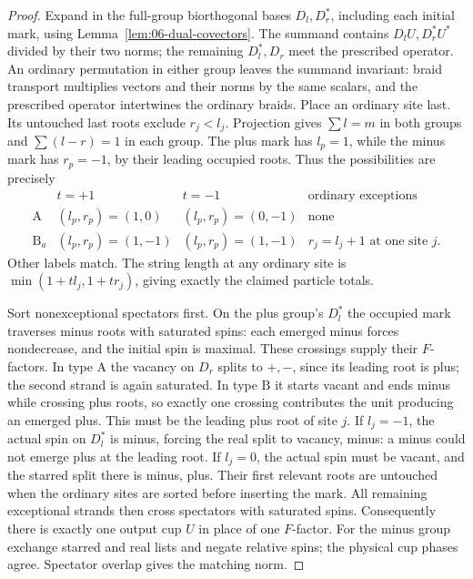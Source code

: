 \begin{proof}
Expand in the full-group biorthogonal bases \(D_l,D_r^*\), including
each initial mark, using Lemma~\ref{lem:06-dual-covectors}.  The summand
contains \(D_lU,D_r^*U^*\) divided by their two norms; the remaining
\(D_l^*,D_r\) meet the prescribed operator.  An ordinary permutation
in either group leaves the summand invariant: braid transport multiplies
vectors and their norms by the same scalars, and the prescribed operator
intertwines the ordinary braids.  Place an ordinary site last.  Its
untouched last roots exclude \(r_j<l_j\).  Projection gives
\(\sum l=m\) in both groups and \(\sum(l-r)=1\) in each group.
The plus mark has \(l_p=1\), while the minus mark has \(r_p=-1\),
by their leading occupied roots.  Thus the possibilities are precisely
\[
\begin{array}{c|cc|c}
 &t=+1&t=-1&\text{ordinary exceptions}\\ \hline
\mathrm A&(l_p,r_p)=(1,0)&(l_p,r_p)=(0,-1)&\text{none}\\
\mathrm B_a&(l_p,r_p)=(1,-1)&(l_p,r_p)=(1,-1)&
 r_j=l_j+1\text{ at one site }j.
\end{array}
\]
Other labels match.  The string length at any ordinary site is
\(\min(1+t l_j,1+t r_j)\), giving exactly the claimed particle totals.

Sort nonexceptional spectators first.  On the plus group's \(D_l^*\)
the occupied mark traverses minus roots with saturated spins: each
emerged minus forces nondecrease, and the initial spin is maximal.
These crossings supply their \(F\)-factors.  In type \(\mathrm A\)
the vacancy on \(D_r\) splits to \(+,-\), since its leading root is
plus; the second strand is again saturated.  In type \(\mathrm B\)
it starts vacant and ends minus while crossing plus roots, so exactly
one crossing contributes the unit producing an emerged plus.  This
must be the leading plus root of site \(j\).  If \(l_j=-1\), the
actual spin on \(D_l^*\) is minus, forcing the real split to vacancy,
minus: a minus could not emerge plus at the leading root.  If
\(l_j=0\), the actual spin must be vacant, and the starred split there
is minus, plus.  Their first relevant roots are untouched when the
ordinary sites are sorted before inserting the mark.  All remaining
exceptional strands then cross spectators with saturated spins.
Consequently there is exactly one output cup \(U\) in place of one
\(F\)-factor.  For the minus group exchange starred and real lists
and negate relative spins; the physical cup phases agree.  Spectator
overlap gives the matching norm.


\end{proof}
